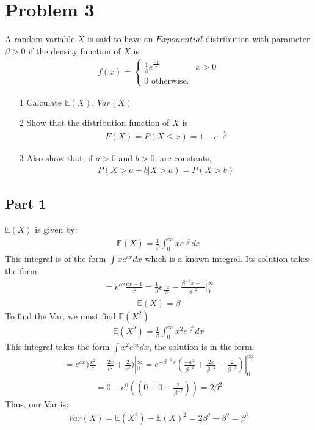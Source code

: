 \documentclass{article}
\begin{document}
\section*{Problem 3}
A random variable $X$ is said to have an $Exponential$ distribution with parameter $\beta>0$ if the density function of $X$ is
\begin{align*}
f(x) = \begin{cases} \frac{1}{\beta} e^{\frac{-x}{\beta}} & x>0 \\
                     0 \text{ otherwise.}
                     \end{cases}
\end{align*}
\begin{enumerate}
\item[1] Calculate $\mathbb{E}(X)$, $Var(X)$
\item[2] Show that the distribution function of $X$ is 
\begin{align*}
F(X) = P(X\leq x) = 1-e^{-\frac{x}{\beta}}
\end{align*}
\item[3] Also show that, if $a>0$ and $b>0$, are constants,
\begin{align*}
 P(X>a+b|X>a) = P(X>b)
\end{align*}
\end{enumerate}
\subsection*{Part 1}
$\mathbb{E}(X)$ is given by:
\begin{align*}
\mathbb{E}(X) = \frac{1}{\beta} \int_{0}^{\infty} x e^{\frac{-x}{\beta}} dx
\end{align*}
This integral is of the form $\int x e^{cx} dx$ which is a known integral. Its solution takes the form:
\begin{align*}
 = e^{cx} \frac{cx-1}{c^2} = \frac{1}{\beta} e_{\frac{-x}{\beta}} -\frac{\beta^{-1} x - 1}{\beta^{-2}} |_{0}^{\infty}
\end{align*}
\begin{align*}
\mathbb{E}(X) = \beta
\end{align*}
To find the Var, we must find $\mathbb{E}(X^2)$
\begin{align*}
\mathbb{E}(X^2) = \frac{1}{\beta} \int_{0}^{\infty} x^2 e^{\frac{-x}{\beta}} dx
\end{align*}
This integral takes the form $\int x^2 e^{cx} dx$, the solution is in the form:
\begin{align*}
 = e^{cx} )\frac{x^2}{c} - \frac{2x}{c^2} + \frac{2}{c^3}) |_{0}^{\infty} = e^{-\beta^{-1} x} (\frac{-x^2}{\beta^{-1}} + \frac{2x}{\beta^{-2}} - \frac{2}{\beta^{-3}}) |_{0}^{\infty}
\end{align*}
\begin{align*}
 = 0 - e^{0} ((0 + 0 - \frac{2}{\beta^{-2}})) = 2\beta^{2}
\end{align*}
Thus, our Var is:
\begin{align*}
\boxed{ Var(X) = \mathbb{E}(X^2) - \mathbb{E}(X)^2 = 2\beta^{2} - \beta^2 = \beta^2}
\end{align*}
\end{document}
